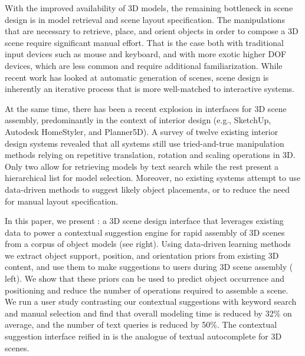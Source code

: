 \documentclass{sigchi}
\begin{document}
With the improved availability of 3D models, the remaining bottleneck in scene design is in model retrieval and scene layout specification. The manipulations that are necessary to retrieve, place, and orient objects in order to compose a 3D scene require significant manual effort.  That is the case both with traditional input devices such as mouse and keyboard, and with more exotic higher DOF devices, which are less common and require additional familiarization. While recent work has looked at automatic generation of scenes, scene design is inherently an iterative process that is more well-matched to interactive systems.  

At the same time, there has been a recent explosion in interfaces for 3D scene assembly, predominantly in the context of interior design (e.g., SketchUp, Autodesk HomeStyler, and Planner5D).  A survey of twelve existing interior design systems revealed that all systems still use tried-and-true manipulation methods relying on repetitive translation, rotation and scaling operations in 3D.  Only two allow for retrieving models by text search while the rest present a hierarchical list for model selection.  Moreover, no existing systems attempt to use data-driven methods to suggest likely object placements, or to reduce the need for manual layout specification.

In this paper, we present \SceneSuggest: a 3D scene design interface that leverages existing data to power a contextual suggestion engine for rapid assembly of 3D scenes from a corpus of object models (see  right).  Using data-driven learning methods we extract object support, position, and orientation priors from existing 3D content, and use them to make suggestions to users during 3D scene assembly ( left).  We show that these priors can be used to predict object occurrence and positioning and reduce the number of operations required to assemble a scene.  We run a user study contrasting our contextual suggestions with keyword search and manual selection and find that overall modeling time is reduced by 32\% on average, and the number of text queries is reduced by 50\%.  The contextual suggestion interface reified in \SceneSuggest is the analogue of textual autocomplete for 3D scenes.
\end{document}
